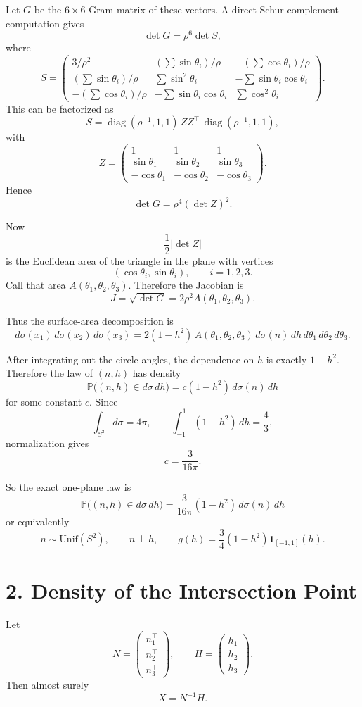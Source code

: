 \documentclass[11pt]{article}
\begin{document}
Let $G$ be the $6 \times 6$ Gram matrix of these vectors. A direct Schur-complement computation
gives
\[
\det G = \rho^6 \det S,
\]
where
\[
S =
\begin{pmatrix}
3/\rho^2 & (\sum \sin\theta_i)/\rho & -(\sum \cos\theta_i)/\rho\\
(\sum \sin\theta_i)/\rho & \sum \sin^2\theta_i & -\sum \sin\theta_i\cos\theta_i\\
-(\sum \cos\theta_i)/\rho & -\sum \sin\theta_i\cos\theta_i & \sum \cos^2\theta_i
\end{pmatrix}.
\]
This can be factorized as
\[
S
=
\operatorname{diag}(\rho^{-1},1,1)\,
ZZ^\top\,
\operatorname{diag}(\rho^{-1},1,1),
\]
with
\[
Z =
\begin{pmatrix}
1 & 1 & 1\\
\sin\theta_1 & \sin\theta_2 & \sin\theta_3\\
-\cos\theta_1 & -\cos\theta_2 & -\cos\theta_3
\end{pmatrix}.
\]
Hence
\[
\det G = \rho^4 (\det Z)^2.
\]

Now
\[
\frac{1}{2}|\det Z|
\]
is the Euclidean area of the triangle in the plane with vertices
\[
(\cos\theta_i,\sin\theta_i), \qquad i=1,2,3.
\]
Call that area $A(\theta_1,\theta_2,\theta_3)$. Therefore the Jacobian is
\[
J = \sqrt{\det G} = 2\rho^2 A(\theta_1,\theta_2,\theta_3).
\]

Thus the surface-area decomposition is
\[
d\sigma(x_1)\,d\sigma(x_2)\,d\sigma(x_3)
=
2(1-h^2)\,A(\theta_1,\theta_2,\theta_3)\,
d\sigma(n)\,dh\,d\theta_1\,d\theta_2\,d\theta_3.
\]

After integrating out the circle angles, the dependence on $h$ is exactly $1-h^2$. Therefore the
law of $(n,h)$ has density
\[
\mathbb{P}\bigl((n,h)\in d\sigma\,dh\bigr)
=
c(1-h^2)\,d\sigma(n)\,dh
\]
for some constant $c$. Since
\[
\int_{S^2} d\sigma = 4\pi,
\qquad
\int_{-1}^1 (1-h^2)\,dh = \frac{4}{3},
\]
normalization gives
\[
c = \frac{3}{16\pi}.
\]

So the exact one-plane law is
\[
\boxed{
\mathbb{P}\bigl((n,h)\in d\sigma\,dh\bigr)
=
\frac{3}{16\pi}(1-h^2)\,d\sigma(n)\,dh
}
\]
or equivalently
\[
\boxed{
n \sim \text{Unif}(S^2),\qquad
n \perp h,\qquad
g(h) = \frac{3}{4}(1-h^2)\mathbf{1}_{[-1,1]}(h).
}
\]

\section*{2. Density of the Intersection Point}

Let
\[
N =
\begin{pmatrix}
n_1^\top\\
n_2^\top\\
n_3^\top
\end{pmatrix},
\qquad
H =
\begin{pmatrix}
h_1\\
h_2\\
h_3
\end{pmatrix}.
\]
Then almost surely
\[
X = N^{-1}H.
\]
\end{document}
